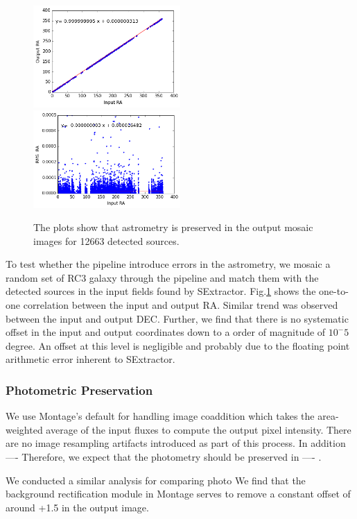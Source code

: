 \documentclass[authoryear, 12pt, 5p, times]{elsarticle}
\begin{document}
\begin{figure}[h]
\includegraphics[width=0.5\textwidth]{figures/ra.png}
\includegraphics[width=0.5\textwidth]{figures/ra_rms.png}
\caption{The plots show that astrometry is preserved in the output mosaic images for 12663 detected sources. }
\label{ra}
\end{figure}
To test whether the pipeline introduce errors in the astrometry, we mosaic a random set of RC3 galaxy through the pipeline and match them with the detected sources in the input fields found by SExtractor.  Fig.\ref{ra} shows the one-to-one correlation between the input and output RA. Similar trend was observed between the input and output DEC. Further, we find that there is no systematic offset in the input and output coordinates down to a order of magnitude of $10^-5$ degree. An offset at this level is negligible and probably due to the floating point arithmetic error inherent to SExtractor.
\subsubsection{Photometric Preservation\label{photo}}

We use Montage's default for  handling image coaddition which takes the area-weighted average of the input fluxes to compute the output pixel intensity. There are no image resampling artifacts introduced as part of this process. In addition ---- 
Therefore, we expect that the photometry should be preserved in ---- . 

We conducted a similar analysis for comparing photo
We find that the background rectification module in Montage serves to remove a constant offset of around +1.5 in the output image. 
\end{document}
